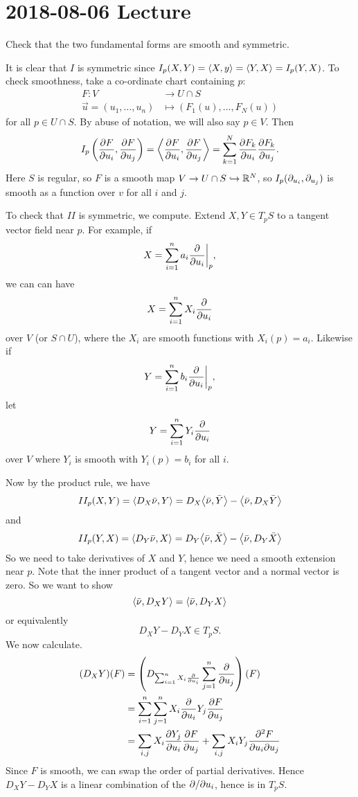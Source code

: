 \section{2018-08-06 Lecture}

Check that the two fundamental forms are smooth and symmetric.

It is clear that $I$ is symmetric since $I_p(X,Y) = {\left\langle X,y \right\rangle} = {\left\langle Y,X \right\rangle} = I_p(Y,X)$.
To check smoothness, take a co-ordinate chart containing $p$:
\begin{align*}
  F: V &\to U \cap S \\
\vec u = (u_1,\ldots,u_n) &\mapsto \left( F_1(u),\ldots,F_N(u) \right)
\end{align*}
for all $p \in U \cap S$.
By abuse of notation, we will also say $p \in V$.
Then
\[ I_p \left( \frac{\partial F}{\partial u_i}, \frac{\partial F}{\partial u_j} \right) = {\left\langle  \frac{\partial F}{\partial u_i}, \frac{\partial F}{\partial u_j}  \right\rangle} = \sum_{k=1}^N \frac{\partial F_k}{\partial u_i} \frac{\partial F_k}{\partial u_j}. \]
Here $S$ is regular, so $F$  is a smooth map $V \to U \cap S \hookrightarrow \mathbb{R}^N$, so $I_p(\partial_{u_i},\partial_{u_j})$ is smooth as a function over $v$ for all $i$ and $j$.

To check that $II$ is symmetric, we compute.
Extend $X, Y \in T_pS$ to a tangent vector field near $p$.
For example, if
\[ X = \sum_{i=1}^n a_i \frac{\partial}{\partial u_i} \bigg\vert_p, \]
we can can have
\[ X = \sum_{i=1}^n X_i \frac{\partial}{\partial u_i} \]
over $V$ (or $S \cap U$), where the $X_i$ are smooth functions with $X_i(p) = a_i$.
Likewise if
\[ Y = \sum_{i=1}^n b_i \frac{\partial}{\partial u_i} \bigg\vert_p, \]
let
\[ Y = \sum_{i=1}^n Y_i \frac{\partial}{\partial u_i} \]
over $V$ where $Y_i$ is smooth with $Y_i(p)=b_i$ for all $i$.

Now by the product rule, we have
\[ II_p(X,Y) = {\left\langle D_X \bar\nu, Y \right\rangle} = D_X {\left\langle \bar\nu, \bar Y \right\rangle} - {\left\langle \bar\nu, D_X\bar Y \right\rangle} \]
and
\[ II_p(Y,X) = {\left\langle D_Y \bar\nu, X \right\rangle} = D_Y {\left\langle \bar\nu, \bar X \right\rangle} - {\left\langle \bar\nu, D_Y\bar X \right\rangle} \]
So we need to take derivatives of $X$ and $Y$, hence we need a smooth extension near $p$.
Note that the inner product of a tangent vector and a normal vector is zero.
So we want to show
\[ {\left\langle \bar\nu, D_X Y \right\rangle} = {\left\langle \bar\nu, D_Y X \right\rangle} \]
or equivalently 
\[ D_XY - D_YX \in T_pS. \]
We now calculate.
\begin{align*}
  (D_XY)(F) &= \left( D_{ \sum_{i=1}^n X_i \frac{\partial}{\partial u_i} } \sum_{j=1}^n \frac{\partial}{\partial u_j} \right)(F) \\
  &= \sum_{i=1}^n \sum_{j=1}^n X_i \frac{\partial}{\partial u_i} Y_j \frac{\partial F}{\partial u_j} \\
  &= \sum_{i,j} X_i \frac{\partial Y_j}{\partial u_i} \frac{\partial F}{\partial u_j} + \sum_{i,j} X_i Y_j \frac{\partial^2 F}{\partial u_i \partial u_j}
\end{align*}
Since $F$ is smooth, we can swap the order of partial derivatives.
Hence $D_XY-D_YX$ is a linear combination of the $\partial/\partial u_i$, hence is in $T_pS$.

